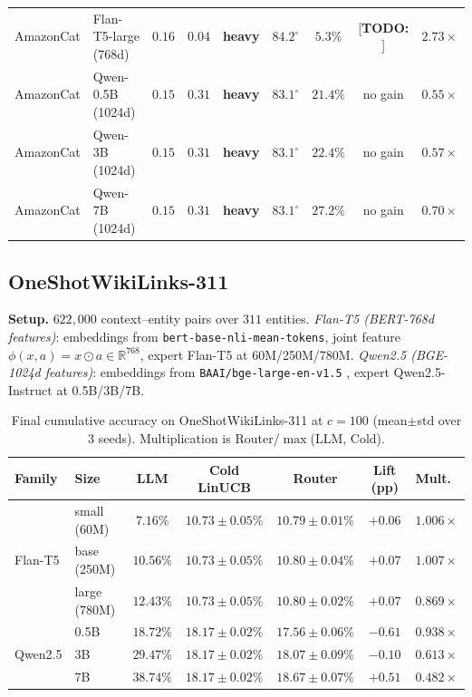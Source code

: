 \documentclass{article}
\theoremstyle{definition}
\theoremstyle{remark}
\theoremstyle{remark}
\newcommand{\todo}[1]{\textcolor{red!70!black}{[\textbf{TODO:} #1]}}
\begin{document}
\begin{table}[h]
\begin{tabular}{@{}llccccccl@{}}
AmazonCat & Flan-T5-large (768d) & $\mathbf{0.16}$ & $\mathbf{0.04}$ & \textbf{heavy} & $\mathbf{84.2^\circ}$ & $5.3\%$ & \todo{} & $\mathbf{2.73\times}$ \\
AmazonCat & Qwen-0.5B (1024d) & $\mathbf{0.15}$ & $0.31$ & \textbf{heavy} & $\mathbf{83.1^\circ}$ & $21.4\%$ & no gain & $0.55\times$ \\
AmazonCat & Qwen-3B (1024d)   & $\mathbf{0.15}$ & $0.31$ & \textbf{heavy} & $\mathbf{83.1^\circ}$ & $22.4\%$ & no gain & $0.57\times$ \\
AmazonCat & Qwen-7B (1024d)   & $\mathbf{0.15}$ & $0.31$ & \textbf{heavy} & $\mathbf{83.1^\circ}$ & $27.2\%$ & no gain & $0.70\times$ \\
\bottomrule
\end{tabular}
\end{table}

\subsection{OneShotWikiLinks-311}
\label{sec:wiki}

\textbf{Setup.} $622{,}000$ context--entity pairs over $311$ entities.
\emph{Flan-T5 (BERT-768d features)}: embeddings from
\texttt{bert-base-nli-mean-tokens}, joint feature $\phi(x,a)=x\odot a\in\mathbb R^{768}$,
expert Flan-T5 \cite{chung2024scaling} at 60M/250M/780M.
\emph{Qwen2.5 (BGE-1024d features)}: embeddings from
\texttt{BAAI/bge-large-en-v1.5} \cite{xiao2024c}, expert Qwen2.5-Instruct
\cite{hui2024qwen2} at 0.5B/3B/7B.

\begin{table}[h]
\centering
\caption{Final cumulative accuracy on OneShotWikiLinks-311 at $c=100$
(mean$\pm$std over 3 seeds). Multiplication is Router/$\max$(LLM, Cold).}
\label{tab:wiki-results}
\small
\begin{tabular}{@{}llccccc@{}}
\toprule
Family & Size & LLM & Cold LinUCB & Router & Lift (pp) & Mult.\ \\
\midrule
\multirow{3}{*}{Flan-T5} & small (60M) & $7.16\%$  & $10.73\pm 0.05\%$ & $10.79\pm 0.01\%$ & $+0.06$ & $1.006\times$ \\
& base (250M)   & $10.56\%$ & $10.73\pm 0.05\%$ & $10.80\pm 0.04\%$ & $+0.07$ & $1.007\times$ \\
& large (780M)  & $12.43\%$ & $10.73\pm 0.05\%$ & $10.80\pm 0.02\%$ & $+0.07$ & $0.869\times$ \\
\midrule
\multirow{3}{*}{Qwen2.5} & 0.5B  & $18.72\%$ & $18.17\pm 0.02\%$ & $17.56\pm 0.06\%$ & $-0.61$ & $0.938\times$ \\
& 3B  & $29.47\%$ & $18.17\pm 0.02\%$ & $18.07\pm 0.09\%$ & $-0.10$ & $0.613\times$ \\
& 7B  & $38.74\%$ & $18.17\pm 0.02\%$ & $18.67\pm 0.07\%$ & $+0.51$ & $0.482\times$ \\
\bottomrule
\end{tabular}
\end{table}
\end{document}
